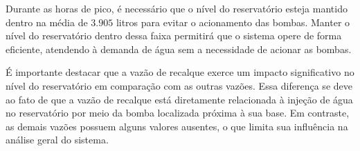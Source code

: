 Durante as horas de pico, é necessário que o nível do reservatório esteja mantido dentro na média de $3.905$ litros para evitar o acionamento das bombas. Manter o nível do reservatório dentro dessa faixa permitirá que o sistema opere de forma eficiente, atendendo à demanda de água sem a necessidade de acionar as bombas.

É importante destacar que a vazão de recalque exerce um impacto significativo no nível do reservatório em comparação com as outras vazões. Essa diferença se deve ao fato de que a vazão de recalque está diretamente relacionada à injeção de água no reservatório por meio da bomba localizada próxima à sua base. Em contraste, as demais vazões possuem alguns valores ausentes, o que limita sua influência na análise geral do sistema.







